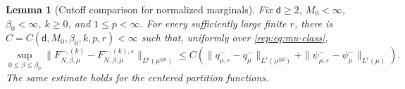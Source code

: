 \documentclass[11pt,reqno]{amsart}
\numberwithin{equation}{section}
\theoremstyle{plain}
\newtheorem{lemma}[lemma]{Lemma}
\theoremstyle{definition}
\renewcommand{\d}{\mathsf d}
\newcommand{\be}{\beta}
\newcommand{\vep}{\varepsilon}
\begin{document}
\begin{lemma}[Cutoff comparison for normalized marginals]\label{rep:lem:cutoff-comparison}
Fix $\d\ge2$, $M_0<\infty$, $\be_0<\infty$, $k\ge0$, and $1\le p<\infty$.  For every sufficiently large finite $r$, there is $C=C(\d,M_0,\be_0,k,p,r)<\infty$ such that, uniformly over \eqref{rep:eq:mu-class},
\begin{equation}\label{rep:eq:marginal-cutoff-comparison}
 \sup_{0\le\be\le\be_0}
 \|F_{N,\be,\mu}^{-,(k)}-F_{N,\be,\mu}^{-,(k),\vep}\|_{L^p(\mu^{\otimes k})}
 \le C\left(
 \|q^-_{\mu,\vep}-q^-_\mu\|_{L^r(\mu^{\otimes2})}
 +\|\psi^-_{\mu,\vep}-\psi^-_\mu\|_{L^r(\mu)}
 \right).
\end{equation}
The same estimate holds for the centered partition functions.
\end{lemma}
\end{document}
